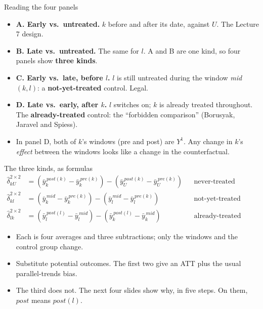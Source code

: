 \documentclass[
  11pt,
  ignorenonframetext,
  aspectratio=169,
]{beamer}
\providecommand{\tightlist}{%
  \setlength{\itemsep}{0pt}\setlength{\parskip}{0pt}}
\begin{document}
\begin{frame}{Reading the four panels}
\protect{}\label{reading-the-four-panels}
\begin{itemize}
\tightlist
\item
  \textbf{A. Early vs.~untreated.} \(k\) before and after its date,
  against \(U\). The Lecture 7 design.
\item
  \textbf{B. Late vs.~untreated.} The same for \(l\). A and B are one
  kind, so four panels show \textbf{three kinds}.
\item
  \textbf{C. Early vs.~late, before \(l\).} \(l\) is still untreated
  during the window \emph{mid}\((k,l)\): a \textbf{not-yet-treated}
  control. Legal.
\item
  \textbf{D. Late vs.~early, after \(k\).} \(l\) switches on; \(k\) is
  already treated throughout. The \textbf{already-treated} control: the
  ``forbidden comparison'' (Borusyak, Jaravel and Spiess).
\end{itemize}

\vspace{0.4em}

\begin{itemize}
\tightlist
\item
  In panel D, both of \(k\)'s windows (pre and post) are \(Y^1\). Any
  change in \(k\)'s \emph{effect} between the windows looks like a
  change in the counterfactual.
\end{itemize}
\end{frame}

\begin{frame}{The three kinds, as formulas}
\protect{}\label{the-three-kinds-as-formulas}
\[
\begin{aligned}
\hat\delta^{2\times2}_{kU} &= (\bar y_k^{\,post(k)} - \bar y_k^{\,pre(k)}) - (\bar y_U^{\,post(k)} - \bar y_U^{\,pre(k)}) &&\text{never-treated control} \\[2pt]
\hat\delta^{2\times2}_{kl} &= (\bar y_k^{\,mid} - \bar y_k^{\,pre(k)}) - (\bar y_l^{\,mid} - \bar y_l^{\,pre(k)}) &&\text{not-yet-treated control} \\[2pt]
\hat\delta^{2\times2}_{lk} &= (\bar y_l^{\,post(l)} - \bar y_l^{\,mid}) - (\bar y_k^{\,post(l)} - \bar y_k^{\,mid}) &&\text{already-treated control}
\end{aligned}
\]

\begin{itemize}
\tightlist
\item
  Each is four averages and three subtractions; only the windows and the
  control group change.
\item
  Substitute potential outcomes. The first two give an ATT plus the
  usual parallel-trends bias.
\item
  The third does not. The next four slides show why, in five steps. On
  them, \(post\) means \(post(l)\).
\end{itemize}
\end{frame}
\end{document}
